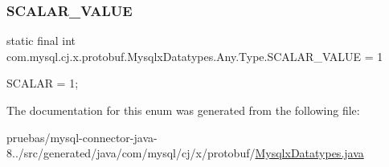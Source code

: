 \subsubsection{\texorpdfstring{S\+C\+A\+L\+A\+R\+\_\+\+V\+A\+L\+UE}{SCALAR\_VALUE}}
{\footnotesize\ttfamily  static  final int com.\+mysql.\+cj.\+x.\+protobuf.\+Mysqlx\+Datatypes.\+Any.\+Type.\+S\+C\+A\+L\+A\+R\+\_\+\+V\+A\+L\+UE = 1\hspace{0.3cm}{\ttfamily [static]}}

{\ttfamily S\+C\+A\+L\+AR = 1;} 

The documentation for this enum was generated from the following file\+:\begin{DoxyCompactItemize}
\item 
pruebas/mysql-\/connector-\/java-\/8../src/generated/java/com/mysql/cj/x/protobuf/\mbox{\hyperlink{_mysqlx_datatypes_8java}{Mysqlx\+Datatypes.\+java}}\end{DoxyCompactItemize}
